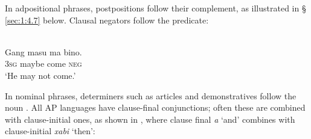  


In adpositional phrases, postpositions follow their complement, as illustrated in {\S} \ref{sec:1:4.7} below. Clausal negators follow the predicate:  


\ea%
\label{ex:1:2}
\\
\gll Gang  masu  ma  bino. \\
\textsc{3sg} maybe  come  \textsc{neg} \\
\glt  `He may not come.' 
\z
 





In nominal phrases, determiners such as articles and demonstratives follow the noun \citep[see][]{KlamerSchapperCorbettTV}. All AP languages have clause-final conjunctions; often these are combined with clause-initial ones, as shown in , where clause final \textit{a} `and' combines with clause-initial \textit{xabi} `then': 



